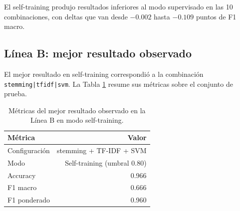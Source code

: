 \documentclass[12pt,a4paper]{article}
\newcommand{\code}[1]{\nolinkurl{#1}}
\begin{document}
\begin{table}[htbp]
\centering
\caption{Resultados de las configuraciones de la Línea B, ordenadas por F1 macro en self-training.}
\label{tab:resultados_globales_b}
\scriptsize
{}
\end{table}
\FloatBarrier

El self-training produjo resultados inferiores al modo supervisado en las 10 combinaciones, con deltas que van desde $-0.002$ hasta $-0.109$ puntos de F1 macro.

\subsection{Línea B: mejor resultado observado}

El mejor resultado en self-training correspondió a la combinación \code{stemming|tfidf|svm}. La Tabla \ref{tab:mejor_modelo_b} resume sus métricas sobre el conjunto de prueba.

\begin{table}[htbp]
\centering
\caption{Métricas del mejor resultado observado en la Línea B en modo self-training.}
\label{tab:mejor_modelo_b}
\small
\begin{tabular}{lr}
\toprule
\textbf{Métrica} & \textbf{Valor} \\
\midrule
Configuración & stemming + TF-IDF + SVM \\
Modo & Self-training (umbral 0.80) \\
Accuracy & 0.966 \\
F1 macro & 0.666 \\
F1 ponderado & 0.960 \\
\bottomrule
\end{tabular}
\end{table}
\FloatBarrier
\end{document}

